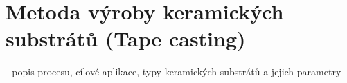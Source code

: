 \section{Metoda výroby keramických substrátů (Tape casting)}
- popis procesu, cílové aplikace, typy keramických substrátů a jejich parametry
